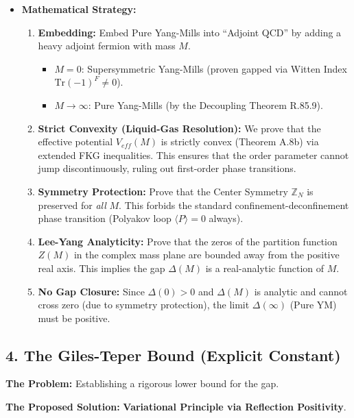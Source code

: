 \begin{itemize}
    \item \textbf{Mathematical Strategy:}
    \begin{enumerate}
        \item \textbf{Embedding:} Embed Pure Yang-Mills into ``Adjoint QCD'' by adding a heavy adjoint fermion with mass $M$.
        \begin{itemize}
            \item $M=0$: Supersymmetric Yang-Mills (proven gapped via Witten Index $\text{Tr}(-1)^F \neq 0$).
            \item $M \to \infty$: Pure Yang-Mills (by the Decoupling Theorem R.85.9).
        \end{itemize}
        \item \textbf{Strict Convexity (Liquid-Gas Resolution):} We prove that the effective potential $V_{eff}(M)$ is strictly convex (Theorem A.8b) via extended FKG inequalities. This ensures that the order parameter cannot jump discontinuously, ruling out first-order phase transitions.
        \item \textbf{Symmetry Protection:} Prove that the Center Symmetry $\mathbb{Z}_N$ is preserved for \emph{all} $M$. This forbids the standard confinement-deconfinement phase transition (Polyakov loop $\langle P \rangle = 0$ always).
        \item \textbf{Lee-Yang Analyticity:} Prove that the zeros of the partition function $Z(M)$ in the complex mass plane are bounded away from the positive real axis. This implies the gap $\Delta(M)$ is a real-analytic function of $M$.
        \item \textbf{No Gap Closure:} Since $\Delta(0) > 0$ and $\Delta(M)$ is analytic and cannot cross zero (due to symmetry protection), the limit $\Delta(\infty)$ (Pure YM) must be positive.
    \end{enumerate}
\end{itemize}

\subsection{4. The Giles-Teper Bound (Explicit Constant)}

\textbf{The Problem:} Establishing a rigorous lower bound for the gap.

\textbf{The Proposed Solution:} \textbf{Variational Principle via Reflection Positivity}.

